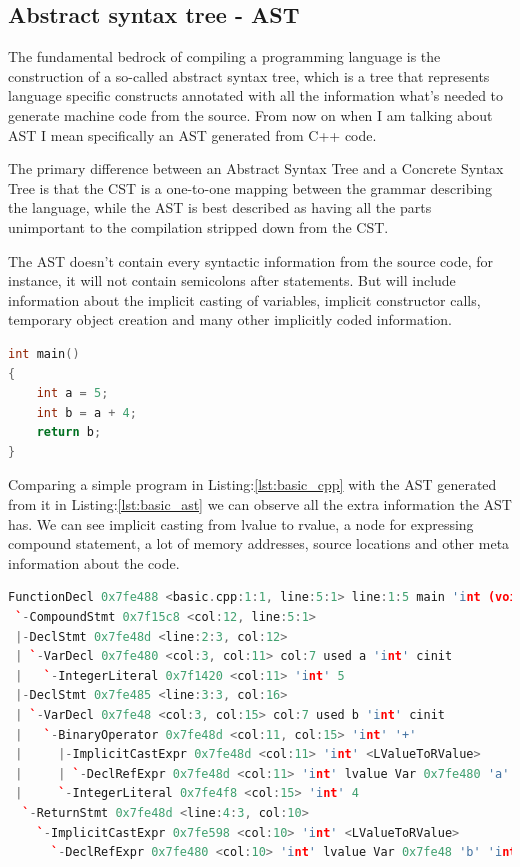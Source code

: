 \subsection{Abstract syntax tree - AST}
\par The fundamental bedrock of compiling a programming language is the construction of a so-called abstract syntax tree, which is a tree that represents language specific constructs annotated with all the information what's needed to generate machine code from the source. From now on when I am talking about AST I mean specifically an AST generated from C++ code. \medskip
\par The primary difference between an Abstract Syntax Tree and a Concrete Syntax Tree is that the CST is a one-to-one mapping between the grammar describing the language, while the AST is best described as having all the parts unimportant to the compilation stripped down from the CST. \medskip
\par The AST doesn't contain every syntactic information from the source code, for instance, it will not contain semicolons after statements. But will include information about the implicit casting of variables, implicit constructor calls, temporary object creation and many other implicitly coded information.
\begin{lstlisting}[language=c++,frame=single, caption={A simple C++ program}, label={lst:basic_cpp}]
int main()
{
	int a = 5;
	int b = a + 4;
	return b;
}
\end{lstlisting}
\par Comparing a simple program in Listing:\ref{lst:basic_cpp} with the AST generated from it in Listing:\ref{lst:basic_ast} we can observe all the extra information the AST has. We can see implicit casting from lvalue to rvalue, a node for expressing compound statement, a lot of memory addresses, source locations and other meta information about the code.
\begin{lstlisting}[basicstyle=\scriptsize, language=c++,frame=single, caption={AST generated}, style=ast, label={lst:basic_ast}]
FunctionDecl 0x7fe488 <basic.cpp:1:1, line:5:1> line:1:5 main 'int (void)'
 `-CompoundStmt 0x7f15c8 <col:12, line:5:1>
 |-DeclStmt 0x7fe48d <line:2:3, col:12>
 | `-VarDecl 0x7fe480 <col:3, col:11> col:7 used a 'int' cinit
 |   `-IntegerLiteral 0x7f1420 <col:11> 'int' 5
 |-DeclStmt 0x7fe485 <line:3:3, col:16>
 | `-VarDecl 0x7fe48 <col:3, col:15> col:7 used b 'int' cinit
 |   `-BinaryOperator 0x7fe48d <col:11, col:15> 'int' '+'
 |     |-ImplicitCastExpr 0x7fe48d <col:11> 'int' <LValueToRValue>
 |     | `-DeclRefExpr 0x7fe48d <col:11> 'int' lvalue Var 0x7fe480 'a' 'int'
 |     `-IntegerLiteral 0x7fe4f8 <col:15> 'int' 4
  `-ReturnStmt 0x7fe48d <line:4:3, col:10>
    `-ImplicitCastExpr 0x7fe598 <col:10> 'int' <LValueToRValue>
      `-DeclRefExpr 0x7fe480 <col:10> 'int' lvalue Var 0x7fe48 'b' 'int'
\end{lstlisting}
